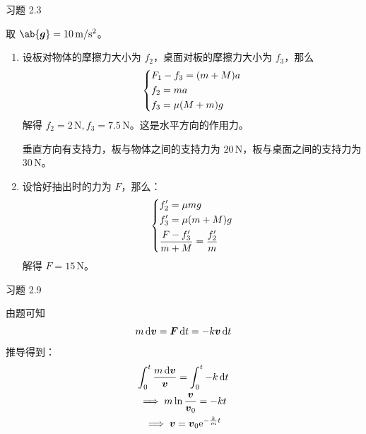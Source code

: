\begin{problem}
    习题 2.3
    \begin{solution}
        取 $\ab{\vect{g}} = 10\,\mathrm{m / s^2}$。
        \begin{enumerate}
            \item[\textbf{1)}] 设板对物体的摩擦力大小为 $f_2$，桌面对板的摩擦力大小为 $f_3$，那么
            $$
            \begin{dcases}
                F_1 - f_3 = (m + M) a \\
                f_2 = m a \\
                f_3 = \mu (M + m) g
            \end{dcases}
            $$
            解得 $f_2 = 2 \,\mathrm{N}, f_3 = 7.5\,\mathrm{N}$。这是水平方向的作用力。

            垂直方向有支持力，板与物体之间的支持力为 $20 \,\mathrm{N}$，板与桌面之间的支持力为 $30 \,\mathrm{N}$。

            \item[\textbf{2)}] 设恰好抽出时的力为 $F$，那么：
            $$
            \begin{dcases}
                f_2' = \mu m g \\
                f_3' = \mu (m + M) g \\
                \frac{F - f_3'}{m + M} = \frac{f_2'}{m}
            \end{dcases}
            $$
            解得 $F = 15 \,\mathrm{N}$。
        \end{enumerate}
    \end{solution}
\end{problem}

\begin{problem}
    习题 2.9
    \begin{solution}
        由题可知
        $$
        m \dd{\boldsymbol{v}} = \boldsymbol{F} \dd{t} = -k \boldsymbol{v} \dd{t}
        $$
        推导得到：
        $$
        \begin{gathered}
            \int_0^t \frac{m \dd{\boldsymbol{v}}}{\boldsymbol{v}} = \int_0^t -k \dd{t} \\
            \implies m \ln \frac{\boldsymbol{v}}{\boldsymbol{v}_0} = -k t \\
            \implies \boldsymbol{v} = \boldsymbol{v}_0 \mathrm{e}^{-\frac{k}{m} t}
        \end{gathered}
        $$
    \end{solution}
\end{problem}

